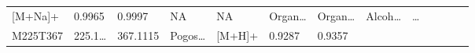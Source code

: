 \documentclass[
]{article}
\begin{document}
\begin{longtable}[]{@{}lllllllllllll@{}}
\begin{minipage}[t]{0.05\columnwidth}
{[}M+Na{]}+\strut
\end{minipage} & \begin{minipage}[t]{0.07\columnwidth}\raggedright
0.9965\strut
\end{minipage} & \begin{minipage}[t]{0.07\columnwidth}\raggedright
0.9997\strut
\end{minipage} & \begin{minipage}[t]{0.05\columnwidth}\raggedright
NA\strut
\end{minipage} & \begin{minipage}[t]{0.04\columnwidth}\raggedright
NA\strut
\end{minipage} & \begin{minipage}[t]{0.05\columnwidth}\raggedright
Organ\ldots{}\strut
\end{minipage} & \begin{minipage}[t]{0.05\columnwidth}\raggedright
Organ\ldots{}\strut
\end{minipage} & \begin{minipage}[t]{0.05\columnwidth}\raggedright
Alcoh\ldots{}\strut
\end{minipage} & \begin{minipage}[t]{0.02\columnwidth}\raggedright
\ldots{}\strut
\end{minipage}\tabularnewline
\begin{minipage}[t]{0.05\columnwidth}\raggedright
M225T367\strut
\end{minipage} & \begin{minipage}[t]{0.05\columnwidth}\raggedright
225.1\ldots{}\strut
\end{minipage} & \begin{minipage}[t]{0.05\columnwidth}\raggedright
367.1115\strut
\end{minipage} & \begin{minipage}[t]{0.05\columnwidth}\raggedright
Pogos\ldots{}\strut
\end{minipage} & \begin{minipage}[t]{0.05\columnwidth}\raggedright
{[}M+H{]}+\strut
\end{minipage} & \begin{minipage}[t]{0.07\columnwidth}\raggedright
0.9287\strut
\end{minipage} & \begin{minipage}[t]{0.07\columnwidth}\raggedright
0.9357\strut
\end{minipage} & \begin{minipage}[t]{0.05\columnwidth}\raggedright

\end{minipage}
\end{longtable}
\end{document}
